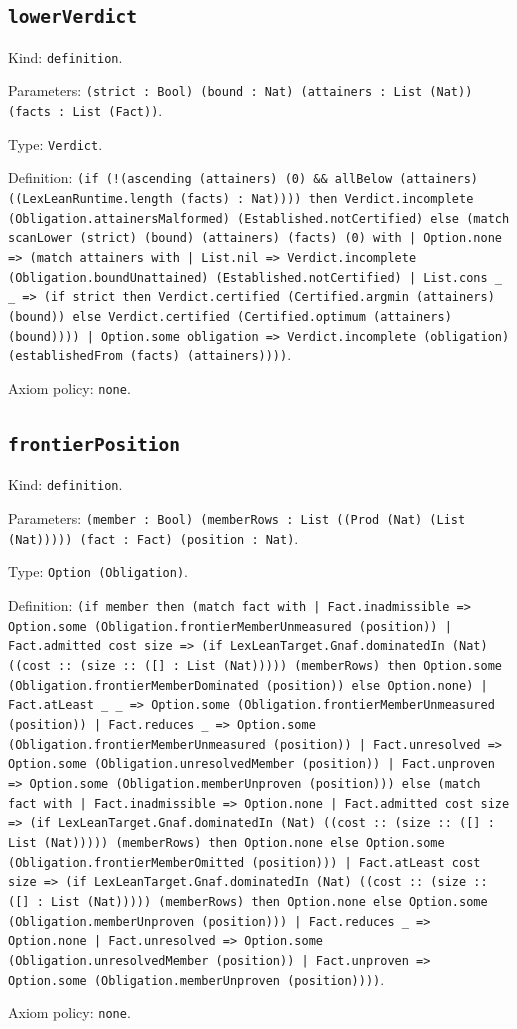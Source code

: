 \documentclass[11pt]{article}
\begin{document}
\subsection*{\texttt{lowerVerdict}}
\noindent Kind: \texttt{definition}.\par
\noindent Parameters: \texttt{(strict : Bool) (bound : Nat) (attainers : List (Nat)) (facts : List (Fact))}.\par
\noindent Type: \texttt{Verdict}.\par
\noindent Definition: \texttt{(if (!(ascending (attainers) (0) \&\& allBelow (attainers) ((LexLeanRuntime.length (facts) : Nat)))) then Verdict.incomplete (Obligation.attainersMalformed) (Established.notCertified) else (match scanLower (strict) (bound) (attainers) (facts) (0) with | Option.none => (match attainers with | List.nil => Verdict.incomplete (Obligation.boundUnattained) (Established.notCertified) | List.cons \_ \_ => (if strict then Verdict.certified (Certified.argmin (attainers) (bound)) else Verdict.certified (Certified.optimum (attainers) (bound)))) | Option.some obligation => Verdict.incomplete (obligation) (establishedFrom (facts) (attainers))))}.\par
\noindent Axiom policy: \texttt{none}.\par
\subsection*{\texttt{frontierPosition}}
\noindent Kind: \texttt{definition}.\par
\noindent Parameters: \texttt{(member : Bool) (memberRows : List ((Prod (Nat) (List (Nat))))) (fact : Fact) (position : Nat)}.\par
\noindent Type: \texttt{Option (Obligation)}.\par
\noindent Definition: \texttt{(if member then (match fact with | Fact.inadmissible => Option.some (Obligation.frontierMemberUnmeasured (position)) | Fact.admitted cost size => (if LexLeanTarget.Gnaf.dominatedIn (Nat) ((cost :: (size :: ([] : List (Nat))))) (memberRows) then Option.some (Obligation.frontierMemberDominated (position)) else Option.none) | Fact.atLeast \_ \_ => Option.some (Obligation.frontierMemberUnmeasured (position)) | Fact.reduces \_ => Option.some (Obligation.frontierMemberUnmeasured (position)) | Fact.unresolved => Option.some (Obligation.unresolvedMember (position)) | Fact.unproven => Option.some (Obligation.memberUnproven (position))) else (match fact with | Fact.inadmissible => Option.none | Fact.admitted cost size => (if LexLeanTarget.Gnaf.dominatedIn (Nat) ((cost :: (size :: ([] : List (Nat))))) (memberRows) then Option.none else Option.some (Obligation.frontierMemberOmitted (position))) | Fact.atLeast cost size => (if LexLeanTarget.Gnaf.dominatedIn (Nat) ((cost :: (size :: ([] : List (Nat))))) (memberRows) then Option.none else Option.some (Obligation.memberUnproven (position))) | Fact.reduces \_ => Option.none | Fact.unresolved => Option.some (Obligation.unresolvedMember (position)) | Fact.unproven => Option.some (Obligation.memberUnproven (position))))}.\par
\noindent Axiom policy: \texttt{none}.\par
\end{document}
